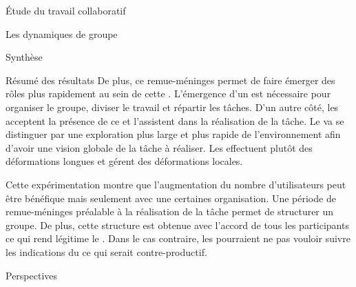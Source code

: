 \documentclass[myfrancais]{mythesis}
\begin{document}
\begin{mypart}{Étude du travail collaboratif}
\begin{mychapter}{Les dynamiques de groupe}
\begin{mysection}{Synthèse}
\begin{mysubsection}{Résumé des résultats}
					De plus, ce remue-méninges permet de faire émerger des rôles plus rapidement au sein de cette .
					L'émergence d'un  est nécessaire pour organiser le groupe, diviser le travail et répartir les tâches.
					D'un autre côté, les  acceptent la présence de ce  et l'assistent dans la réalisation de la tâche.
					Le  va se distinguer par une exploration plus large et plus rapide de l'environnement afin d'avoir une vision globale de la tâche à réaliser.
					Les  effectuent plutôt des déformations longues et gérent des déformations locales.

					Cette expérimentation montre que l'augmentation du nombre d'utilisateurs peut être bénéfique mais seulement avec une certaines organisation.
					Une période de remue-méninges préalable à la réalisation de la tâche permet de structurer un groupe.
					De plus, cette structure est obtenue avec l'accord de tous les participants ce qui rend légitime le .
					Dans le cas contraire, les  pourraient ne pas vouloir suivre les indications du  ce qui serait contre-productif.
				\end{mysubsection}
				\begin{mysubsection}{Perspectives}
				\end{mysubsection}
			\end{mysection}
		\end{mychapter}
	\end{mypart}
\end{document}
